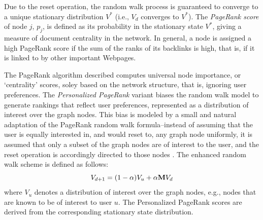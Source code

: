 \documentclass[11pt,oneside]{book}
\newcommand{\transition}{{\bf M}}
\begin{document}

Due to the reset operation, the random walk process is guaranteed to
converge to a unique stationary distribution $V^*$ (i.e., $V_d$
converges to $V^*$). The {\it PageRank score} of node $j$, $p_j$, is
defined as its probability in the stationary state $V^*$, giving a
measure of document centrality in the network. In general, a node is
assigned a high PageRank score if the sum of the ranks of its
backlinks is high, that is, if it is linked to by other important
Webpages.


The PageRank algorithm described computes universal node importance,
or `centrality' scores, soley based on the network structure, that is,
ignoring user preferences. The {\it Personalized PageRank} variant
\cite{pagerank,RichardsonNIPS02} biases the random walk model to
generate rankings that reflect user preferences, represented as a
distribution of interest over the graph nodes. This bias is modeled by
a small and natural adaptation of the PageRank random walk
formula--instead of assuming that the user is equally interested in,
and would reset to, any graph node uniformly, it is assumed that only
a subset of the graph nodes are of interest to the user, and the reset
operation is accordingly directed to those nodes . The enhanced random
walk scheme is defined as follows:
\begin{equation}
V_{d+1} = (1-\alpha) V_u + \alpha \transition V_d
\label{eq:ppr}
\end{equation}
where $V_u$ denotes a distribution of interest over the graph nodes,
e.g., nodes that are known to be of interest to user $u$.  The
Personalized PageRank scores are derived from the corresponding
stationary state distribution. 
\end{document}
